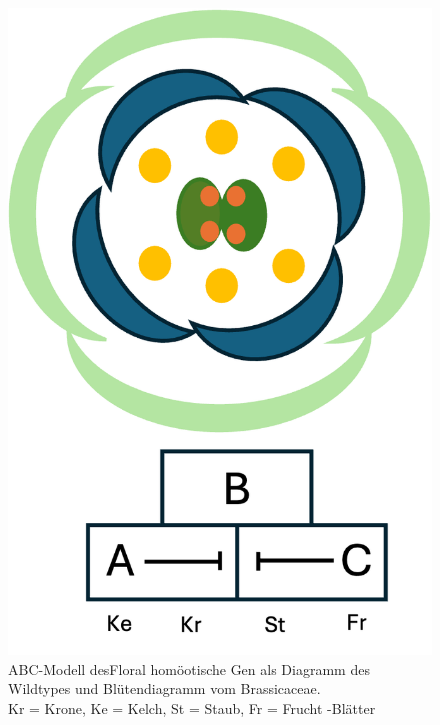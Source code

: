 \documentclass[10pt,a4paper]{article}
\begin{document}
	
		\begin{figure}[H]
			\centering
			\includegraphics[scale=0.85]{Wildtyp_diagramm.png}
			\caption{ABC-Modell desFloral homöotische Gen als Diagramm des Wildtypes und Blütendiagramm vom Brassicaceae.\\
			Kr = Krone, Ke = Kelch, St = Staub, Fr = Frucht -Blätter}
			\label{fig:floralgene_Wildtyp}
		\end{figure}
	
\end{document}
